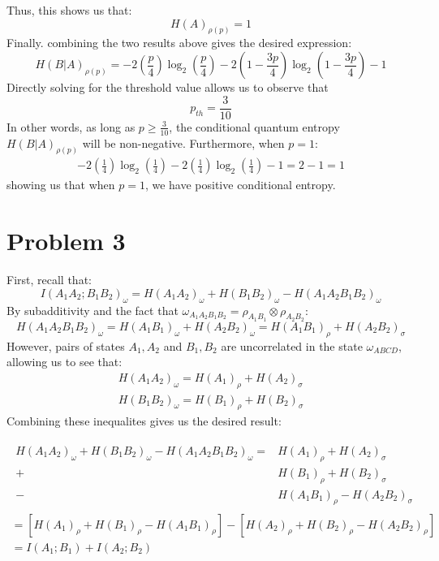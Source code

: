 \documentclass[12pt]{article}%
\begin{document}
 Thus, this shows us that:
 $$ H(A)_{\rho(p)} = 1 $$
 Finally. combining the two results above gives the desired expression:
 $$ H(B \vert A)_{\rho(p)} =  - 2(\frac{p}{4})\log_2{(\frac{p}{4})} - 2 (1 - \frac{3p}{4})\log_2{(1- \frac{3p}{4})} - 1$$
 Directly solving for the threshold value allows us to observe that
 $$ p_{th} = \frac{3}{10} $$
 In other words, as long as $p \geq \frac{3}{10}$, the conditional quantum entropy $H(B \vert A)_{\rho(p)}$ will be non-negative. Furthermore, when $p =1$:
 \begin{gather*}
   - 2(\frac{1}{4})\log_2{(\frac{1}{4})} - 2 (\frac{1}{4})\log_2{( \frac{1}{4})} - 1 = 2 - 1 = 1
 \end{gather*}
 showing us that when $p=1$, we have positive conditional entropy.

\section*{Problem 3}
First, recall that:
\begin{equation*}
  I(A_1A_2; B_1B_2)_{\omega} = H(A_1A_2)_{\omega} + H(B_1B_2)_{\omega} - H(A_1A_2B_1B_2)_{\omega}
\end{equation*}
By subadditivity and the fact that $\omega_{A_1A_2B_1B_2} = \rho_{A_1B_1}\otimes \rho_{A_2B_2}$:
$$H(A_1A_2B_1B_2)_{\omega} = H(A_1B_1)_{\omega} + H(A_2B_2)_{\omega} =
H(A_1B_1)_{\rho} + H(A_2B_2)_{\sigma}
$$
However, pairs of states $A_1,A_2$ and $B_1,B_2$ are uncorrelated in the state $\omega_{ABCD}$, allowing us to see that:
\begin{gather*}
  H(A_1A_2)_{\omega} = H(A_1)_{\rho} + H(A_2)_{\sigma} \\
  H(B_1B_2)_{\omega} = H(B_1)_{\rho} + H(B_2)_{\sigma}
\end{gather*}
Combining these inequalites gives us the desired result:

\begin{gather*}
  \begin{split}
    H(A_1A_2)_{\omega} + H(B_1B_2)_{\omega} - H(A_1A_2B_1B_2)_{\omega} = & H(A_1)_{\rho} + H(A_2)_{\sigma} \\+ & H(B_1)_{\rho} + H(B_2)_{\sigma} \\ -
    & H(A_1B_1)_{\rho} - H(A_2B_2)_{\sigma}
  \end{split}\\
  = [H(A_1)_{\rho} + H(B_1)_{\rho} - H(A_1B_1)_{\rho}] - [H(A_2)_{\rho} + H(B_2)_{\rho} - H(A_2B_2)_{\rho}] \\
  = \boxed{I(A_1; B_1) + I(A_2; B_2)}
\end{gather*}
\end{document}
